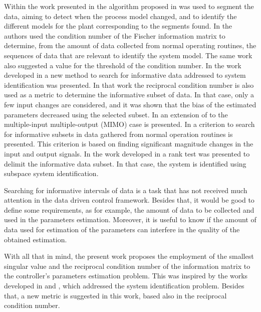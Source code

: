 \documentclass[letterpaper, 10 pt, conference]{ieeeconf}  %
\begin{document}
Within the work presented in \cite{shardt2014segmentation} the algorithm proposed in \cite{peretzki2011data} was used to segment the data, aiming to detect when the process model changed, and to identify the different models for the plant corresponding to the segments found.
In \cite{shardt2013data} the authors used the condition number of the Fischer information matrix to determine, from the amount of data collected from normal operating routines, the sequences of data that are relevant to identify the system model.
The same work also suggested a value for the threshold of the condition number.
In the work developed in \cite{arengas2017searching} a new method to search for informative data addressed to system identification was presented.
In that work the reciprocal condition number is also used as a metric to determine the informative subset of data.
In that case, only a few input changes are considered, and it was shown that the bias of the estimated parameters decreased using the selected subset.
In \cite{arengas2017search} an extension of \cite{arengas2017searching} to the multiple-input multiple-output (MIMO) case is presented.
In \cite{wang2018searching} a criterion to search for informative subsets in data gathered from normal operation routines is presented.
This criterion is based on finding significant magnitude changes in the input and output signals.
In the work developed in \cite{bitmead2017subspace} a rank test was presented to delimit the informative data subset.
In that case, the system is identified using subspace system identification.

Searching for informative intervals of data is a task that has not received much attention in the data driven control framework.
Besides that, it would be good to define some requirements, as for example, the amount of data to be collected and used in the parameters estimation.
Moreover, it is useful to know if the amount of data used for estimation of the parameters can interfere in the quality of the obtained estimation.

With all that in mind, the present work proposes the employment of the smallest singular value and the reciprocal condition number of the information matrix to the controller's parameters estimation problem.
This was inspired by the works developed in \cite{carrette1996discarding} and \cite{bittencourt2015algorithm}, which addressed the system identification problem.
Besides that, a new metric is suggested in this work, based also in the reciprocal condition number.
\end{document}
